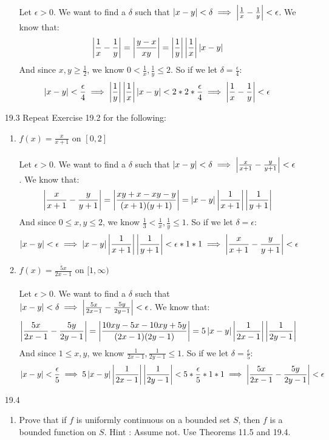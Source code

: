 \begin{enumerate}
\begin{enumerate}
        Let $\epsilon > 0$. We want to find a $\delta$ such that $\left\vert x-y \right\vert < \delta \implies \left\vert \frac{1}{x} - \frac{1}{y} \right\vert < \epsilon$. We know that:
        $$\left\vert \frac{1}{x} - \frac{1}{y} \right\vert = \left\vert \frac{y-x}{xy} \right\vert = \left\vert \frac{1}{y} \right\vert \left\vert \frac{1}{x} \right\vert \left\vert x-y \right\vert$$
        And since $x,y \geq \frac{1}{2}$, we know $0 < \frac{1}{x}, \frac{1}{y} \leq 2$. So if we let $\delta = \frac{\epsilon}{4}$:
        $$\left\vert x-y \right\vert < \frac{\epsilon}{4} \implies \left\vert \frac{1}{y} \right\vert \left\vert \frac{1}{x} \right\vert \left\vert x-y \right\vert < 2*2*\frac{\epsilon}{4} \implies \left\vert \frac{1}{x} - \frac{1}{y} \right\vert < \epsilon$$
    \end{enumerate}
  \item [19.3]
    Repeat Exercise 19.2 for the following:
    \begin{enumerate}
      \item $f(x) = \frac{x}{x+1}$ on $[0,2]$\\\\

        Let $\epsilon > 0$. We want to find a $\delta$ such that $\left\vert x-y \right\vert < \delta \implies \left\vert \frac{x}{x+1} - \frac{y}{y+1} \right\vert < \epsilon$. We know that:
        $$\left\vert \frac{x}{x+1} - \frac{y}{y+1} \right\vert = \left\vert \frac{xy+x-xy-y}{(x+1)(y+1)} \right\vert = \left\vert x-y \right\vert \left\vert \frac{1}{x+1} \right\vert \left\vert \frac{1}{y+1} \right\vert$$
        And since $0 \leq x,y \leq 2$, we know $\frac{1}{3} < \frac{1}{x}, \frac{1}{y} \leq 1$. So if we let $\delta = \epsilon$:
        $$\left\vert x-y \right\vert < \epsilon \implies \left\vert x-y \right\vert \left\vert \frac{1}{x+1} \right\vert \left\vert \frac{1}{y+1} \right\vert < \epsilon * 1 * 1 \implies \left\vert \frac{x}{x+1} - \frac{y}{y+1} \right\vert < \epsilon$$
        
      \item $f(x) = \frac{5x}{2x-1}$ on $[1,\infty)$\\\\

        Let $\epsilon > 0$. We want to find a $\delta$ such that $\left\vert x-y \right\vert < \delta \implies \left\vert \frac{5x}{2x-1} - \frac{5y}{2y-1} \right\vert < \epsilon$. We know that:
        $$\left\vert \frac{5x}{2x-1} - \frac{5y}{2y-1} \right\vert = \left\vert \frac{10xy-5x-10xy+5y}{(2x-1)(2y-1)} \right\vert = 5 \left\vert x-y \right\vert \left\vert \frac{1}{2x-1} \right\vert \left\vert \frac{1}{2y-1} \right\vert$$
        And since $1 \leq x,y$, we know $\frac{1}{2x-1}, \frac{1}{2y-1} \leq 1$. So if we let $\delta = \frac{\epsilon}{5}$:
        $$\left\vert x-y \right\vert < \frac{\epsilon}{5} \implies 5 \left\vert x-y \right\vert \left\vert \frac{1}{2x-1} \right\vert \left\vert \frac{1}{2y-1} \right\vert < 5 * \frac{\epsilon}{5} * 1 * 1 \implies \left\vert \frac{5x}{2x-1} - \frac{5y}{2y-1} \right\vert < \epsilon$$

    \end{enumerate}
  \item [19.4]
    \begin{enumerate}
      \item Prove that if $f$ is uniformly continuous on a bounded set $S$, then $f$ is a bounded function on $S$. Hint : Assume not. Use Theorems 11.5 and 19.4.\\\\


\end{enumerate}
\end{enumerate}
